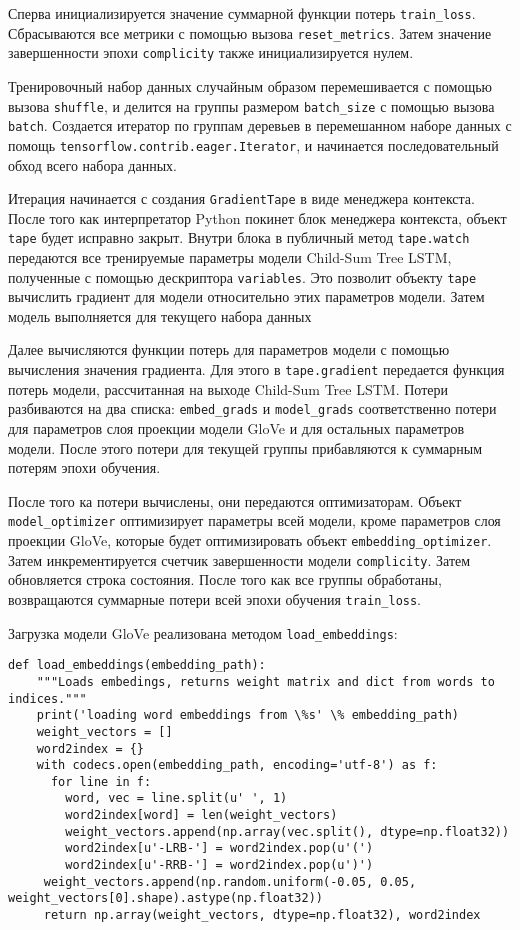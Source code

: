 Сперва инициализируется значение суммарной функции потерь \texttt{tra\-in\_loss}. Сбрасываются все метрики с помощью вызова \texttt{reset\_metrics}. Затем значение завершенности эпохи \texttt{complicity} также инициализируется нулем.

Тренировочный набор данных случайным образом перемешивается с помощью вызова \texttt{shuffle}, и делится на группы размером \texttt{batch\_size} с помощью вызова \texttt{batch}. Создается итератор по группам деревьев в перемешанном наборе данных с помощь \texttt{tensorflow.contrib.eager.Itera\-tor}, и начинается последовательный обход всего набора данных.

Итерация начинается с создания \texttt{GradientTape} в виде менеджера контекста. После того как интерпретатор Python покинет блок менеджера контекста, объект \texttt{tape} будет исправно закрыт. Внутри блока в публичный метод \texttt{tape.watch} передаются все тренируемые параметры модели Child-Sum Tree LSTM\@, полученные с помощью дескриптора \texttt{variables}. Это позволит объекту \texttt{tape} вычислить градиент для модели относительно этих параметров модели. Затем модель выполняется для текущего набора данных

Далее вычисляются функции потерь для параметров модели с помощью вычисления значения градиента. Для этого в \texttt{tape.gradient} передается функция потерь модели, рассчитанная на выходе Child-Sum Tree LSTM\@. Потери разбиваются на два списка: \texttt{embed\_grads} и \texttt{model\_grads} соответственно потери для параметров слоя проекции модели GloVe и для остальных параметров модели. После этого потери для текущей группы прибавляются к суммарным потерям эпохи обучения.

После того ка потери вычислены, они передаются оптимизаторам. Объект \texttt{model\_optimizer} оптимизирует параметры всей модели, кроме параметров слоя проекции GloVe, которые будет оптимизировать объект \texttt{embed\-ding\_optimizer}. Затем инкрементируется счетчик завершенности модели \texttt{complicity}. Затем обновляется строка состояния. После того как все группы обработаны, возвращаются суммарные потери всей эпохи обучения \texttt{train\_loss}.

Загрузка модели GloVe реализована методом \texttt{load\_embeddings}:
\medskip
\begin{lstlisting}[style=Python]
  def load_embeddings(embedding_path):
    """Loads embedings, returns weight matrix and dict from words to indices."""
    print('loading word embeddings from \%s' \% embedding_path)
    weight_vectors = []
    word2index = {}
    with codecs.open(embedding_path, encoding='utf-8') as f:
      for line in f:
        word, vec = line.split(u' ', 1)
        word2index[word] = len(weight_vectors)
        weight_vectors.append(np.array(vec.split(), dtype=np.float32))
        word2index[u'-LRB-'] = word2index.pop(u'(')
        word2index[u'-RRB-'] = word2index.pop(u')')
     weight_vectors.append(np.random.uniform(-0.05, 0.05, weight_vectors[0].shape).astype(np.float32))
     return np.array(weight_vectors, dtype=np.float32), word2index
\end{lstlisting}
\medskip

